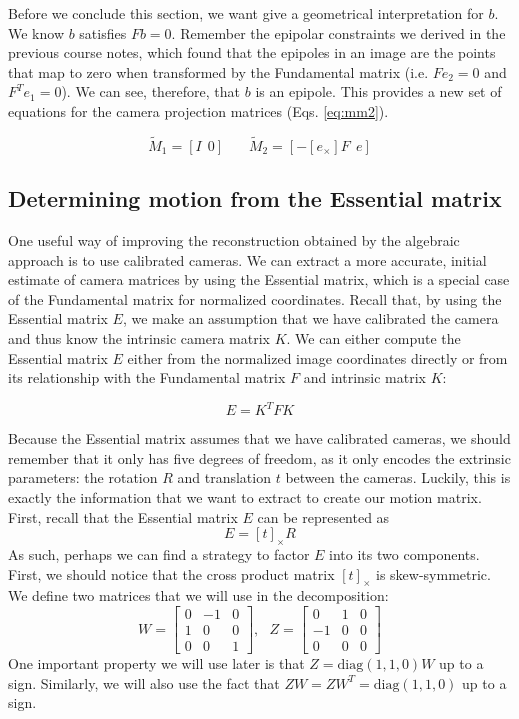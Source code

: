 \documentclass[a4paper, 12pt]{article}
\numberwithin{equation}{section}
\begin{document}
Before we conclude this section, we want give a geometrical interpretation for $b$. We know $b$ satisfies $Fb=0$. Remember the epipolar constraints we derived in the previous course notes, which found that the epipoles in an image are the points that map to zero when transformed by the Fundamental matrix (i.e. $Fe_2=0$ and $F^T e_1=0$). We can see, therefore, that $b$ is an epipole. This provides a new set of equations for the camera projection matrices (Eqs. \ref{eq:mm2}). 

\begin{equation}
    \tilde{M}_1 = [I ~~ 0] ~~~~~~~~ \tilde{M}_2 = [- [e_\times]F ~~ e]
    \label{eq:mm2}
\end{equation}

\subsection{Determining motion from the Essential matrix}
One useful way of improving the reconstruction obtained by the algebraic approach is to use calibrated cameras. We can extract a more accurate, initial estimate of camera matrices by using the Essential matrix, which is a special case of the Fundamental matrix for normalized coordinates. Recall that, by using the Essential matrix $E$, we make an assumption that we have calibrated the camera and thus know the intrinsic camera matrix $K$. We can either compute the Essential matrix $E$ either from the normalized image coordinates directly or from its relationship with the Fundamental matrix $F$ and intrinsic matrix $K$:

\begin{equation}
    E = K^TFK
\end{equation}

Because the Essential matrix assumes that we have calibrated cameras, we should remember that it only has five degrees of freedom, as it only encodes the extrinsic parameters: the rotation $R$ and translation $t$ between the cameras. Luckily, this is exactly the information that we want to extract to create our motion matrix. First, recall that the Essential matrix $E$ can be represented as
\begin{equation}
    E = [t]_\times R
\end{equation}
As such, perhaps we can find a strategy to factor $E$ into its two components. First, we should notice that the cross product matrix $[t]_\times$ is skew-symmetric. We define two matrices that we will use in the decomposition:
\begin{equation}
     W = \begin{bmatrix} 0 & -1 & 0 \\ 1 & 0 & 0 \\ 0 & 0 & 1\end{bmatrix}, ~~~ Z = \begin{bmatrix} 0 & 1 & 0 \\ -1 & 0 & 0 \\ 0 & 0 & 0\end{bmatrix}
\end{equation}
One important property we will use later is that $Z = \mathrm{diag}(1,1,0)W$ up to a sign. Similarly, we will also use the fact that $ZW = ZW^T = \mathrm{diag}(1,1,0)$ up to a sign. 
\end{document}
